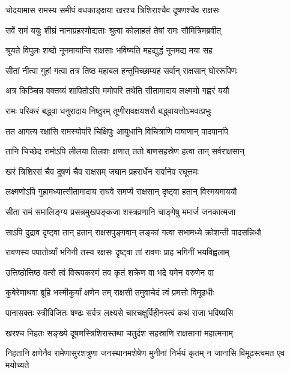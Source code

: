 \twolineshloka
{चोदयामास रामस्य समीपं वधकाङ्क्षया}
{खरश्च त्रिशिराश्चैव दूषणश्चैव राक्षसः} %

\twolineshloka
{सर्वे रामं ययुः शीघ्रं नानाप्रहरणोद्यताः}
{श्रुत्वा कोलाहलं तेषां रामः सौमित्रिमब्रवीत्} %

\twolineshloka
{श्रूयते विपुलः शब्दो नूनमायान्ति राक्षसाः}
{भविष्यति महद्युद्धं नूनमद्य मया सह} %

\twolineshloka
{सीतां नीत्वा गुहां गत्वा तत्र तिष्ठ महाबल}
{हन्तुमिच्छाम्यहं सर्वान् राक्षसान् घोररूपिणः} %

\twolineshloka
{अत्र किञ्चिन्न वक्तव्यं शापितोऽसि ममोपरि}
{तथेति सीतामादाय लक्ष्मणो गह्वरं ययौ} %

\twolineshloka
{रामः परिकरं बद्ध्वा धनुरादाय निष्ठुरम्}
{तूणीरावक्षयशरौ बद्ध्वायत्तोऽभवत्प्रभुः} %

\twolineshloka
{तत आगत्य रक्षांसि रामस्योपरि चिक्षिपुः}
{आयुधानि विचित्राणि पाषाणान् पादपानपि} %

\twolineshloka
{तानि चिच्छेद रामोऽपि लीलया तिलशः क्षणात्}
{ततो बाणसहस्रेण हत्वा तान् सर्वराक्षसान्} %

\twolineshloka
{खरं त्रिशिरसं चैव दूषणं चैव राक्षसम्}
{जघान प्रहरार्धेन सर्वानेव रघूत्तमः} %

\twolineshloka
{लक्ष्मणोऽपि गुहामध्यात्सीतामादाय राघवे}
{समर्प्य राक्षसान् दृष्ट्वा हतान् विस्मयमाययौ} %

\twolineshloka
{सीता रामं समालिङ्ग्य प्रसन्नमुखपङ्कजा}
{शस्त्रव्रणानि चाङ्गेषु ममार्ज जनकात्मजा} %

\twolineshloka
{साऽपि दुद्राव दृष्ट्वा तान् हतान् राक्षसपुङ्गवान्}
{लङ्कां गत्वा सभामध्ये क्रोशन्ती पादसन्निधौ} %

\twolineshloka
{रावणस्य पपातोर्व्यां भगिनी तस्य रक्षसः}
{दृष्ट्वा तां रावणः प्राह भगिनीं भयविह्वलाम्} %

\twolineshloka
{उत्तिष्ठोत्तिष्ठ वत्से त्वं विरूपकरणं तव}
{कृतं शक्रेण वा भद्रे यमेन वरुणेन वा} %

\twolineshloka
{कुबेरेणाथवा ब्रूहि भस्मीकुर्यां क्षणेन तम्}
{राक्षसी तमुवाचेदं त्वं प्रमत्तो विमूढधीः} %

\twolineshloka
{पानासक्तः स्त्रीविजितः षण्ढः सर्वत्र लक्ष्यसे}
{चारचक्षुर्विहीनस्त्वं कथं राजा भविष्यसि} %

\twolineshloka
{खरश्च निहतः सङ्ख्ये दूषणस्त्रिशिरास्तथा}
{चतुर्दश सहस्राणि राक्षसानां महात्मनाम्} %

\threelineshloka
{निहतानि क्षणेनैव रामेणासुरशत्रुणा}
{जनस्थानमशेषेण मुनीनां निर्भयं कृतम्}
{न जानासि विमूढस्त्वमत एव मयोच्यते} %

